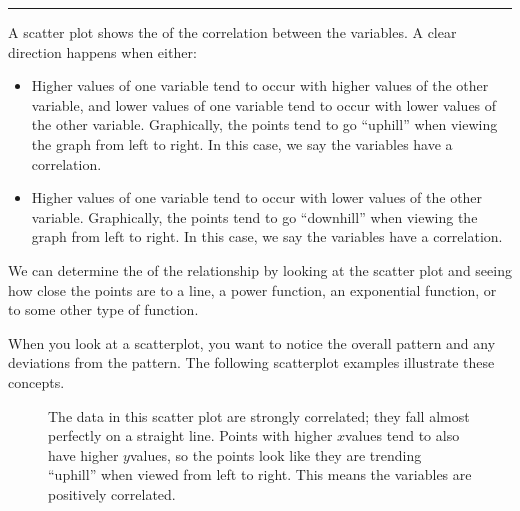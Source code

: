 \documentclass[letterpaper,10pt,english]{jupyterBook}
\begin{document}
\bigskip\hrule\bigskip


\sphinxAtStartPar
A scatter plot shows the  of the correlation between the variables. A clear direction happens when either:
\begin{itemize}
\item {} 
\sphinxAtStartPar
Higher values of one variable tend to occur with higher values of the other variable, and lower values of one variable tend to occur with lower values of the other variable. Graphically, the points tend to go “uphill” when viewing the graph from left to right. In this case, we say the variables have a  correlation.

\item {} 
\sphinxAtStartPar
Higher values of one variable tend to occur with lower values of the other variable. Graphically, the points tend to go “downhill” when viewing the graph from left to right. In this case, we say the variables have a  correlation.

\end{itemize}

\sphinxAtStartPar
We can determine the  of the relationship by looking at the scatter plot and seeing how close the points are to a line, a power function, an exponential function, or to some other type of function.

\sphinxAtStartPar
When you look at a scatterplot, you want to notice the overall pattern and any deviations from the pattern. The following scatterplot examples illustrate these concepts.

\begin{figure}[htbp]
\centering
\capstart

\noindent{}
\caption{The data in this scatter plot are strongly correlated; they fall almost perfectly on a straight line. Points with higher \(x\)\sphinxhyphen{}values tend to also have higher \(y\)\sphinxhyphen{}values, so the points look like they are trending “uphill” when viewed from left to right. This means the variables are positively correlated.}\label{\detokenize{Ch8 Correlation and Linear Regression/8.1 Scatter Plots:scatterplot2}}\end{figure}
\end{document}
